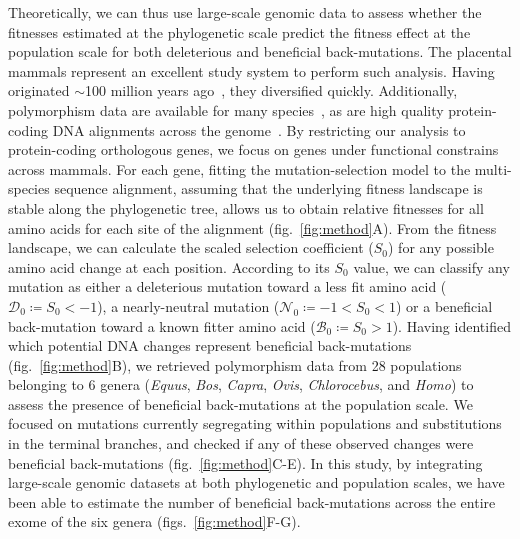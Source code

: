 \documentclass[12pt]{article}
\newcommand{\Sphy}{S_{0}}
\newcommand{\SphyDel}{\mathcal{D}_0}
\newcommand{\SphyNeu}{\mathcal{N}_0}
\newcommand{\SphyBen}{\mathcal{B}_0}
\begin{document}
Theoretically, we can thus use large-scale genomic data to assess whether the fitnesses estimated at the phylogenetic scale predict the fitness effect at the population scale for both deleterious and beneficial back-mutations.
The placental mammals represent an excellent study system to perform such analysis.
Having originated $\sim$100 million years ago~\cite{kumar_timetree_2017}, they diversified quickly.
Additionally, polymorphism data are available for many species~\cite{howe_ensembl_2021}, as are high quality protein-coding DNA alignments across the genome~\cite{ranwez_orthomam_2007, scornavacca_orthomam_2019}.
By restricting our analysis to protein-coding orthologous genes, we focus on genes under functional constrains across mammals.
For each gene, fitting the mutation-selection model to the multi-species sequence alignment, assuming that the underlying fitness landscape is stable along the phylogenetic tree, allows us to obtain relative fitnesses for all amino acids for each site of the alignment (fig.~\ref{fig:method}A).
From the fitness landscape, we can calculate the scaled selection coefficient ($\Sphy$) for any possible amino acid change at each position.
According to its $\Sphy$ value, we can classify any mutation as either a deleterious mutation toward a less fit amino acid ($\SphyDel \coloneqq \Sphy < -1$), a nearly-neutral mutation ($\SphyNeu \coloneqq -1 < \Sphy <1$) or a beneficial back-mutation toward a known fitter amino acid ($\SphyBen \coloneqq \Sphy > 1$).
Having identified which potential DNA changes represent beneficial back-mutations (fig.~\ref{fig:method}B), we retrieved polymorphism data from 28 populations belonging to 6 genera (\textit{Equus}, \textit{Bos}, \textit{Capra}, \textit{Ovis}, \textit{Chlorocebus}, and \textit{Homo}) to assess the presence of beneficial back-mutations at the population scale.
We focused on mutations currently segregating within populations and substitutions in the terminal branches, and checked if any of these observed changes were beneficial back-mutations (fig.~\ref{fig:method}C-E).
In this study, by integrating large-scale genomic datasets at both phylogenetic and population scales, we have been able to estimate the number of beneficial back-mutations across the entire exome of the six genera (figs.~\ref{fig:method}F-G).
\end{document}
